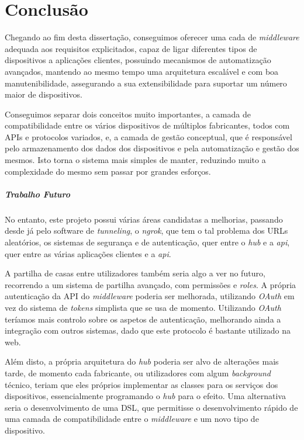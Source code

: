 \chapter{Conclusão}

Chegando ao fim desta dissertação, conseguimos oferecer uma cada de \textit{middleware} adequada aos requisitos explicitados, capaz de ligar diferentes tipos de dispositivos a aplicações clientes, possuindo mecanismos de automatização avançados, mantendo ao mesmo tempo uma arquitetura escalável e com boa manutenibilidade, assegurando a sua extensibilidade para suportar um número maior de dispositivos.

Conseguimos separar dois conceitos muito importantes, a camada de compatibilidade entre os vários dispositivos de múltiplos fabricantes, todos com APIs e protocolos variados, e, a camada de gestão conceptual, que é responsável pelo armazenamento dos dados dos dispositivos e pela automatização e gestão dos mesmos. Isto torna o sistema mais simples de manter, reduzindo muito a complexidade do mesmo sem passar por grandes esforços.

\paragraph*{Trabalho Futuro}

No entanto, este projeto possui várias áreas candidatas a melhorias, passando desde já pelo software de \textit{tunneling}, o \textit{ngrok}, que tem o tal problema dos URLs aleatórios, os sistemas de segurança e de autenticação, quer entre o \textit{hub} e a \textit{api}, quer entre as várias aplicações clientes e a \textit{api}. 

A partilha de casas entre utilizadores também seria algo a ver no futuro, recorrendo a um sistema de partilha avançado, com permissões e \textit{roles}. A própria autenticação da API do \textit{middleware} poderia ser melhorada, utilizando \textit{OAuth} em vez do sistema de \textit{tokens} simplista que se usa de momento. Utilizando \textit{OAuth} teríamos mais controlo sobre os aspetos de autenticação, melhorando ainda a integração com outros sistemas, dado que este protocolo é bastante utilizado na web.

Além disto, a própria arquitetura do \textit{hub} poderia ser alvo de alterações mais tarde, de momento cada fabricante, ou utilizadores com algum \textit{background} técnico, teriam que eles próprios implementar as classes para os serviços dos dispositivos, essencialmente programando o \textit{hub} para o efeito. Uma alternativa seria o desenvolvimento de uma DSL, que permitisse o desenvolvimento rápido de uma camada de compatibilidade entre o \textit{middleware} e um novo tipo de dispositivo.

